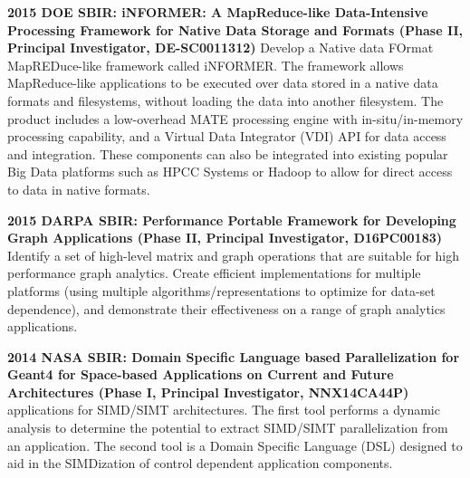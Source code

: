 \begin{itemize}
 	\textbf{2015 DOE SBIR: iNFORMER: A MapReduce-like Data-Intensive Processing
 		Framework for Native Data Storage and Formats (Phase II, Principal
 		Investigator, DE-SC0011312)}
 	Develop a Native data FOrmat
 	MapREDuce-like framework called iNFORMER. The framework allows
 	MapReduce-like applications to be executed over data stored in a
 	native data formats and filesystems, without loading the data into
 	another filesystem. The product includes a low-overhead MATE
 	processing engine with in-situ/in-memory processing capability, and a
 	Virtual Data Integrator (VDI) API for data access and
 	integration. These components can also be integrated into existing
 	popular Big Data platforms such as HPCC Systems or Hadoop to allow for
 	direct access to data in native formats.
 	
 	\textbf{2015 DARPA SBIR: Performance Portable Framework for
 		Developing Graph Applications (Phase II, Principal Investigator,
 		D16PC00183)}
 	Identify a set of high-level matrix and graph operations
 	that are suitable for high performance graph analytics. Create
 	efficient implementations for multiple platforms (using multiple
 	algorithms/representations to optimize for data-set dependence), and
 	demonstrate their effectiveness on a range of graph analytics
 	applications.
 	
 	
 	\textbf{2014 NASA SBIR: Domain Specific Language based
 		Parallelization for Geant4 for Space-based Applications on Current and
 		Future Architectures (Phase I, Principal Investigator, NNX14CA44P)}
 	applications for SIMD/SIMT architectures.  The first tool performs a
 	dynamic analysis to determine the potential to extract SIMD/SIMT
 	parallelization from an application. The second tool is a Domain
 	Specific Language (DSL) designed to aid in the SIMDization of control
 	dependent application components.
 	

\end{itemize}
